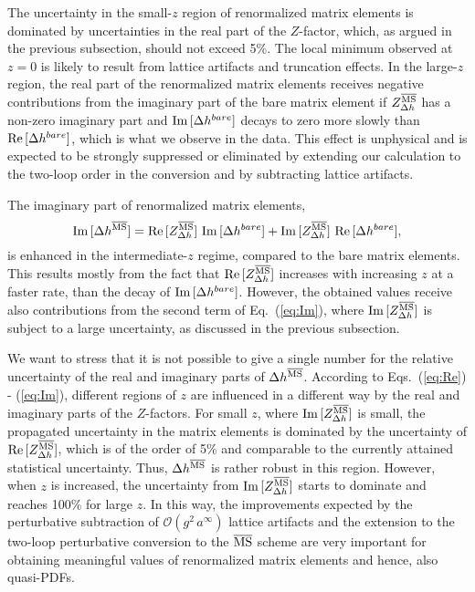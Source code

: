 \documentclass[12pt,tighten,nofootinbib,amssymb,floatfix]{article}
\newcommand{\MSb}{{\overline{\rm MS}}}
\renewcommand{\Re}{{\rm Re}\,}
\renewcommand{\Im}{{\rm Im}\,}
\newcommand{\be}{\begin{equation}}
\newcommand{\ee}{\end{equation}}
\begin{document}
The uncertainty in the small-$z$ region of renormalized matrix elements is dominated by uncertainties in the real part of the $Z$-factor, which, as argued in the previous subsection, should not exceed 5\%. 
The local minimum observed at $z{=}0$ is likely to result from lattice artifacts and truncation effects.
In the large-$z$ region, the real part of the renormalized matrix elements receives negative contributions from the imaginary part of the bare matrix element if $Z_{\Delta h}^{\MSb}$ has a non-zero imaginary part and $\Im[\Delta h^{bare}]$ decays to zero more slowly than $\Re[\Delta h^{bare}]$, which is what we observe in the data.
This effect is unphysical and is expected to be strongly suppressed or eliminated by extending our calculation to the two-loop order in the conversion and by subtracting lattice artifacts.

The imaginary part of renormalized matrix elements,
\be
\label{eq:Im}
\Im[\Delta h^\MSb]=\Re[Z_{\Delta h}^{\MSb}]\,\, \Im[\Delta h^{bare}]+\Im[Z_{\Delta h}^{\MSb}]\,\, \Re[\Delta h^{bare}],
\ee
is enhanced in the intermediate-$z$ regime, compared to the bare matrix elements. This results mostly from the fact that 
$\Re[Z_{\Delta h}^{\MSb}]$ increases with increasing $z$ at a faster rate, than the decay of $\Im[\Delta h^{bare}]$.
However, the obtained values receive also contributions from the second term of Eq.~(\ref{eq:Im}), where $\Im[Z_{\Delta h}^{\MSb}]$ 
is subject to a large uncertainty, as discussed in the previous subsection.

We want to stress that it is not possible to give a single number for the relative uncertainty of the real and imaginary parts of $\Delta h^\MSb$.
According to Eqs.~(\ref{eq:Re}) - (\ref{eq:Im}), different regions of $z$ are influenced in a different way by the real and imaginary parts of the $Z$-factors.
For small $z$, where $\Im[Z_{\Delta h}^{\MSb}]$ is small, the propagated uncertainty in the matrix elements is dominated by the uncertainty of
 $\Re[Z_{\Delta h}^{\MSb}]$, which is of the order of 5\% and comparable to the currently attained statistical uncertainty. Thus, $\Delta h^\MSb$
is rather robust in this region. However, when $z$ is increased, the uncertainty from $\Im[Z_{\Delta h}^{\MSb}]$ starts to dominate and reaches 
100\% for large $z$. In this way, the improvements expected by the perturbative subtraction of $\mathcal{O}(g^2\,a^\infty)$ lattice artifacts and the extension 
to the two-loop perturbative conversion to the $\MSb$ scheme are very important for obtaining meaningful values of renormalized matrix elements and hence, also quasi-PDFs.
\end{document}
